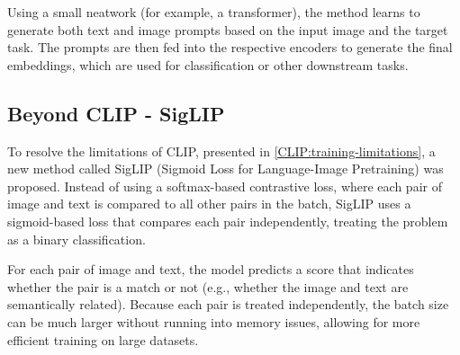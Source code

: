 Using a small neatwork (for example, a transformer), the method learns to generate both text and image prompts based on the input image and the target task.
The prompts are then fed into the respective encoders to generate the final embeddings, which are used for classification or other downstream tasks.

\subsection{Beyond CLIP - SigLIP}
To resolve the limitations of CLIP, presented in \autoref{CLIP:training-limitations}, a new method called SigLIP (Sigmoid Loss for Language-Image Pretraining) was proposed.
Instead of using a softmax-based contrastive loss, where each pair of image and text is compared to all other pairs in the batch, 
SigLIP uses a sigmoid-based loss that compares each pair independently, treating the problem as a binary classification.

For each pair of image and text, the model predicts a score that indicates whether the pair is a match or not (e.g., whether the image and text are semantically related).
Because each pair is treated independently, the batch size can be much larger without running into memory issues, allowing for more efficient training on large datasets.

